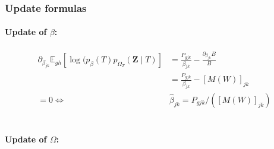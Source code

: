 \documentclass[11pt,a4paper]{article}
\newcommand{\Zbf}{\boldsymbol{Z}}
\newcommand{\Esp}{\mathds{E}}
\begin{document}
\subsubsection{Update formulas}
\paragraph{Update of $\beta$:}
\begin{align*}
\partial_{\beta_{jk}} \Esp_{gh} [\log (p_\beta(T)p_{\Omega_T}(\Zbf\mid T) ] &= \frac{P_{gjk}}{\beta_{jk}} - \frac{\partial_{\beta_{jk}} B }{B} \\
&=\frac{P_{gjk}}{\beta_{jk}}  - [M(W)]_{jk} \\
=0 \iff & \boxed{\widehat{\beta}_{jk} = P_{gjk} / ([M(W)]_{jk})}
\end{align*}\\


\paragraph{Update of $\Omega$:}
\end{document}
